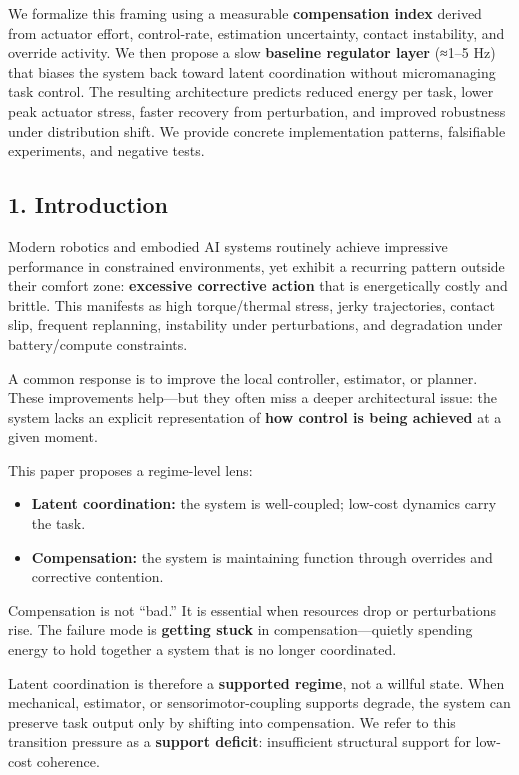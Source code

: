 \documentclass[11pt]{article}
\providecommand{\tightlist}{%
  \setlength{\itemsep}{0pt}\setlength{\parskip}{0pt}}
\begin{document}
We formalize this framing using a measurable \textbf{compensation index} derived from actuator effort, control-rate, estimation uncertainty, contact instability, and override activity. We then propose a slow \textbf{baseline regulator layer} (≈1--5 Hz) that biases the system back toward latent coordination without micromanaging task control. The resulting architecture predicts reduced energy per task, lower peak actuator stress, faster recovery from perturbation, and improved robustness under distribution shift. We provide concrete implementation patterns, falsifiable experiments, and negative tests.

\hypertarget{introduction}{%
\subsection{1. Introduction}\label{introduction}}

Modern robotics and embodied AI systems routinely achieve impressive performance in constrained environments, yet exhibit a recurring pattern outside their comfort zone: \textbf{excessive corrective action} that is energetically costly and brittle. This manifests as high torque/thermal stress, jerky trajectories, contact slip, frequent replanning, instability under perturbations, and degradation under battery/compute constraints.

A common response is to improve the local controller, estimator, or planner. These improvements help---but they often miss a deeper architectural issue: the system lacks an explicit representation of \textbf{how control is being achieved} at a given moment.

This paper proposes a regime-level lens:

\begin{itemize}
\tightlist
\item
  \textbf{Latent coordination:} the system is well-coupled; low-cost dynamics carry the task.
\item
  \textbf{Compensation:} the system is maintaining function through overrides and corrective contention.
\end{itemize}

Compensation is not ``bad.'' It is essential when resources drop or perturbations rise. The failure mode is \textbf{getting stuck} in compensation---quietly spending energy to hold together a system that is no longer coordinated.

Latent coordination is therefore a \textbf{supported regime}, not a willful state. When mechanical, estimator, or sensorimotor-coupling supports degrade, the system can preserve task output only by shifting into compensation. We refer to this transition pressure as a \textbf{support deficit}: insufficient structural support for low-cost coherence.
\end{document}
